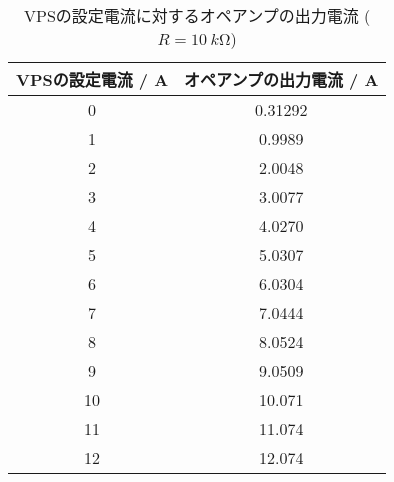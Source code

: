 \begin{table}[!htp]\centering
	\caption{VPSの設定電流に対するオペアンプの出力電流 ($R=\SI{10}{k\ohm}$)}\label{tab:exp3-10k}
	\scriptsize
	\begin{tabular}{cc}\toprule
		VPSの設定電流 / \si{A} & オペアンプの出力電流 / \si{A} \\\midrule
		0                 & 0.31292             \\
		1                 & 0.9989              \\
		2                 & 2.0048              \\
		3                 & 3.0077              \\
		4                 & 4.0270              \\
		5                 & 5.0307              \\
		6                 & 6.0304              \\
		7                 & 7.0444              \\
		8                 & 8.0524              \\
		9                 & 9.0509              \\
		10                & 10.071              \\
		11                & 11.074              \\
		12                & 12.074              \\
		\bottomrule
	\end{tabular}
\end{table}
